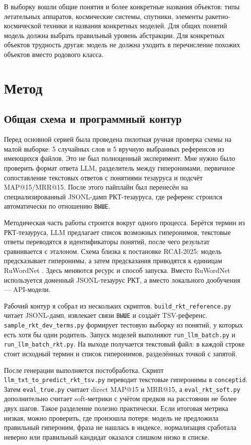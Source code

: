 \documentclass[12pt,a4paper,oneside,openany]{report}
\begin{document}
В выборку вошли общие понятия и более конкретные названия объектов: типы летательных аппаратов, космические системы, спутники, элементы ракетно-космической техники и названия конкретных моделей. Для общих понятий модель должна выбрать правильный уровень абстракции. Для конкретных объектов трудность другая: модель не должна уходить в перечисление похожих объектов вместо родового класса.

\chapter{Метод}

\section{Общая схема и программный контур}

Перед основной серией была проведена пилотная ручная проверка схемы на малой выборке: 5 случайных слов и 5 вручную выбранных референсов из имеющихся файлов. Это не был полноценный эксперимент. Мне нужно было проверить формат ответа LLM, разделитель между гиперонимами, первичное сопоставление текстовых ответов с понятиями тезауруса и подсчёт MAP@15/MRR@15. После этого пайплайн был перенесён на специализированный JSONL-дамп РКТ-тезауруса, где референс строился автоматически по отношению \texttt{ВЫШЕ}.

Методическая часть работы строится вокруг одного процесса. Берётся термин из РКТ-тезауруса, LLM предлагает список возможных гиперонимов, текстовые ответы переводятся в идентификаторы понятий, после чего результат сравнивается с эталоном. Схема близка к постановке RCAI-2025: модель предсказывает гиперонимы, а затем предсказания приводятся к единицам RuWordNet \cite{rcai2025}. Здесь меняются ресурс и способ запуска. Вместо RuWordNet используется доменный JSONL-тезаурус РКТ, а вместо локального дообучения — API-модели.

Рабочий контур я собрал из нескольких скриптов. \texttt{build\_rkt\_reference.py} читает JSONL-дамп, извлекает связи \texttt{ВЫШЕ} и создаёт TSV-референс. \texttt{sample\_rkt\_dev\_terms.py} формирует тестовую выборку из понятий, у которых есть хотя бы один родитель. Запуск моделей выполняют \texttt{run\_llm\_batch.py} и \texttt{run\_llm\_batch\_rkt.py}. На выходе получается текстовый файл: в каждой строке стоит исходный термин и список гиперонимов, разделённых точкой с запятой.

После генерации выполняется постобработка. Скрипт \texttt{llm\_txt\_to\_predict\_rkt\_tsv.py} переводит текстовые гиперонимы в \texttt{conceptid}. Затем \texttt{eval\_true.py} считает direct MAP@15 и MRR@15, а \texttt{eval\_rkt\_soft.py} дополнительно считает soft-метрики с учётом предков на расстоянии не более двух шагов. Такое разделение полезно практически. Если итоговая метрика низкая, можно проверить, где произошла потеря: модель не предложила правильный гипероним, фраза не нашлась в индексе, нормализация сработала неверно или правильный кандидат оказался слишком низко в списке.
\end{document}
